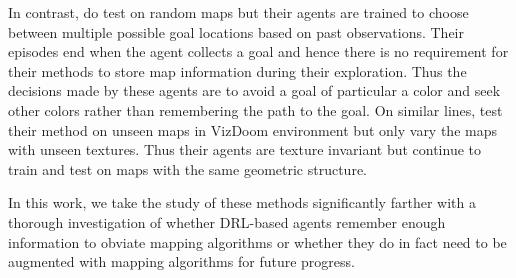 In contrast, \cite{OhChSiICML2016} do test on random maps but their agents are trained to choose between multiple possible goal locations based on past observations. Their episodes end when the agent collects a goal and hence there is no requirement for their methods to store map information during their exploration. Thus the decisions made by these agents are to avoid a goal of particular a color and seek other colors rather than remembering the path to the goal. On similar lines, \cite{ChLaSaNIPS2016} test their method on unseen maps in VizDoom environment but only vary the maps with unseen textures. Thus their agents are texture invariant but continue to train and test on maps with the same geometric structure.
%

In this work, we take the study of these methods significantly farther with a thorough investigation of whether DRL-based agents remember enough information to obviate mapping algorithms or whether they do in fact need to be augmented with mapping algorithms for future progress.
